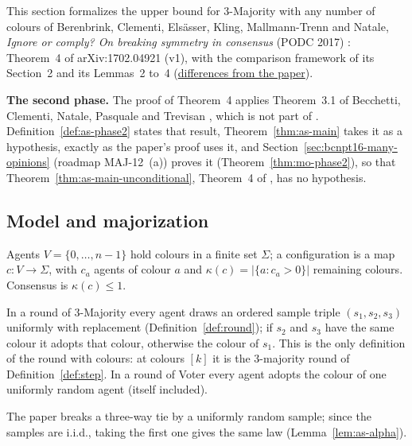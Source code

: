 This section formalizes the upper bound for 3-Majority with any number of colours of
Berenbrink, Clementi, Elsässer, Kling, Mallmann-Trenn and Natale, \emph{Ignore or comply? On
breaking symmetry in consensus} (PODC 2017) \cite{BCEKMN17}: Theorem~4 of arXiv:1702.04921 (v1),
with the comparison framework of its Section~2 and its Lemmas~2 to~4
(\href{https://github.com/formal-dynamics/leanamics/blob/main/plurality/FORMALIZATION_DIFFERENCES.md#6-3-majority-from-any-configuration-anystart-roadmap-maj-6-b}{differences
from the paper}).

\textbf{The second phase.} The proof of Theorem~4 applies Theorem~3.1 of Becchetti, Clementi,
Natale, Pasquale and Trevisan \cite{BCNPT16}, which is not part of \cite{BCEKMN17}.
Definition~\ref{def:as-phase2} states that result, Theorem~\ref{thm:as-main} takes it as a
hypothesis, exactly as the paper's proof uses it, and Section~\ref{sec:bcnpt16-many-opinions}
(roadmap MAJ-12~(a)) proves it (Theorem~\ref{thm:mo-phase2}), so that
Theorem~\ref{thm:as-main-unconditional}, Theorem~4 of \cite{BCEKMN17}, has no hypothesis.

\subsection{Model and majorization}

Agents $V=\{0,\dots,n-1\}$ hold colours in a finite set $\Sigma$; a configuration is a map
$c\colon V\to\Sigma$, with $c_a$ agents of colour $a$ and $\kappa(c)=|\{a : c_a>0\}|$ remaining
colours. Consensus is $\kappa(c)\le1$.

\begin{definition}\label{def:as-model}
\leanok
{}
In a round of 3-Majority every agent draws an ordered sample triple $(s_1,s_2,s_3)$ uniformly
with replacement (Definition~\ref{def:round}); if $s_2$ and $s_3$ have the same colour it adopts
that colour, otherwise the colour of $s_1$. This is the only definition of the round with colours:
at colours $[k]$ it is the 3-majority round of Definition~\ref{def:step}. In a round of Voter every agent adopts the colour of
one uniformly random agent (itself included).
\end{definition}

The paper breaks a three-way tie by a uniformly random sample; since the samples are i.i.d.,
taking the first one gives the same law (Lemma~\ref{lem:as-alpha}).

